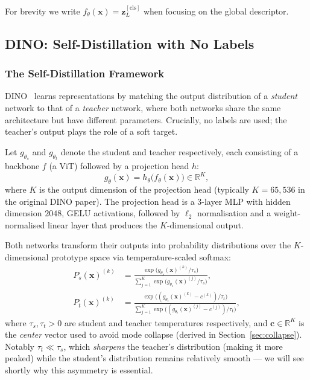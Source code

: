 \documentclass[11pt,a4paper]{article}
\newcommand{\R}{\mathbb{R}}
\newcommand{\vect}[1]{\mathbf{#1}}
\newcommand{\thetaS}{\theta_{s}}
\newcommand{\thetaT}{\theta_{t}}
\newcommand{\gS}{g_{\thetaS}}
\newcommand{\gT}{g_{\thetaT}}
\newcommand{\PS}{P_{s}}
\newcommand{\PT}{P_{t}}
\begin{document}
For brevity we write $f_{\theta}(\vect{x}) = \vect{z}_{L}^{[\text{cls}]}$
when focusing on the global descriptor.

\subsection{DINO: Self-Distillation with No Labels}
\label{sec:dino}

\subsubsection{The Self-Distillation Framework}

DINO~\citep{caron2021emerging} learns representations by matching the output
distribution of a \emph{student} network to that of a \emph{teacher} network,
where both networks share the same architecture but have different parameters.
Crucially, no labels are used; the teacher's output plays the role of a
soft target.

Let $\gS$ and $\gT$ denote the student and teacher respectively, each
consisting of a backbone $f$ (a ViT) followed by a projection head $h$:
\begin{equation}
g_{\theta}(\vect{x}) = h_{\theta}\bigl(f_{\theta}(\vect{x})\bigr) \in \R^{K},
\end{equation}
where $K$ is the output dimension of the projection head (typically
$K = 65{,}536$ in the original DINO paper). The projection head is a 3-layer
MLP with hidden dimension $2048$, GELU activations, followed by $\ell_{2}$
normalisation and a weight-normalised linear layer that produces the
$K$-dimensional output.

Both networks transform their outputs into probability distributions over
the $K$-dimensional prototype space via temperature-scaled softmax:
\begin{align}
\PS(\vect{x})^{(k)} &= \frac{\exp\bigl(\gS(\vect{x})^{(k)}/\tau_{s}\bigr)}
                            {\sum_{j=1}^{K}\exp\bigl(\gS(\vect{x})^{(j)}/\tau_{s}\bigr)}, \\
\PT(\vect{x})^{(k)} &= \frac{\exp\bigl((\gT(\vect{x})^{(k)}-c^{(k)})/\tau_{t}\bigr)}
                            {\sum_{j=1}^{K}\exp\bigl((\gT(\vect{x})^{(j)}-c^{(j)})/\tau_{t}\bigr)},
\end{align}
where $\tau_{s},\tau_{t} > 0$ are student and teacher temperatures
respectively, and $\vect{c} \in \R^{K}$ is the \emph{center} vector used
to avoid mode collapse (derived in
Section~\ref{sec:collapse}). Notably $\tau_{t} \ll \tau_{s}$, which
\emph{sharpens} the teacher's distribution (making it more peaked) while
the student's distribution remains relatively smooth --- we will see
shortly why this asymmetry is essential.
\end{document}
